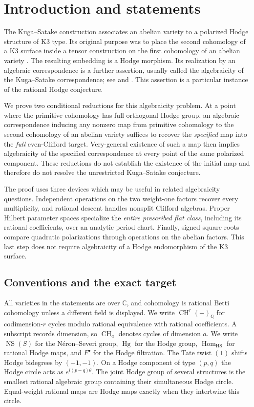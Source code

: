 \section{Introduction and statements}\label{sec:introduction}

The Kuga--Satake construction associates an abelian variety to a polarized Hodge structure of K3 type. Its original purpose was to place the second cohomology of a K3 surface inside a tensor construction on the first cohomology of an abelian variety \cite{KugaSatake}. The resulting embedding is a Hodge morphism. Its realization by an algebraic correspondence is a further assertion, usually called the algebraicity of the Kuga--Satake correspondence; see \cite[Chapter 4]{Huybrechts} and \cite{vanGeemen}. This assertion is a particular instance of the rational Hodge conjecture.

We prove two conditional reductions for this algebraicity problem. At a point where the primitive cohomology has full orthogonal Hodge group, an algebraic correspondence inducing any nonzero map from primitive cohomology to the second cohomology of an abelian variety suffices to recover the \emph{specified} map into the \emph{full} even-Clifford target. Very-general existence of such a map then implies algebraicity of the specified correspondence at every point of the same polarized component. These reductions do not establish the existence of the initial map and therefore do not resolve the unrestricted Kuga--Satake conjecture.

The proof uses three devices which may be useful in related algebraicity questions. Independent operations on the two weight-one factors recover every multiplicity, and rational descent handles nonsplit Clifford algebras. Proper Hilbert parameter spaces specialize the \emph{entire prescribed flat class}, including its rational coefficients, over an analytic period chart. Finally, signed square roots compare quadratic polarizations through operations on the abelian factors. This last step does not require algebraicity of a Hodge endomorphism of the K3 surface.

\subsection{Conventions and the exact target}

All varieties in the statements are over $\mathbb C$, and cohomology is rational Betti cohomology unless a different field is displayed. We write $\operatorname{CH}^r(-)_{\mathbb Q}$ for codimension-$r$ cycles modulo rational equivalence with rational coefficients. A subscript records dimension, so $\operatorname{CH}_a$ denotes cycles of dimension $a$. We write $\operatorname{NS}(S)$ for the N\'eron--Severi group, $\operatorname{Hg}$ for the Hodge group, $\operatorname{Hom}_{\mathrm{HS}}$ for rational Hodge maps, and $F^\bullet$ for the Hodge filtration. The Tate twist $(1)$ shifts Hodge bidegrees by $(-1,-1)$. On a Hodge component of type $(p,q)$ the Hodge circle acts as $e^{i(p-q)\theta}$. The joint Hodge group of several structures is the smallest rational algebraic group containing their simultaneous Hodge circle. Equal-weight rational maps are Hodge maps exactly when they intertwine this circle.

